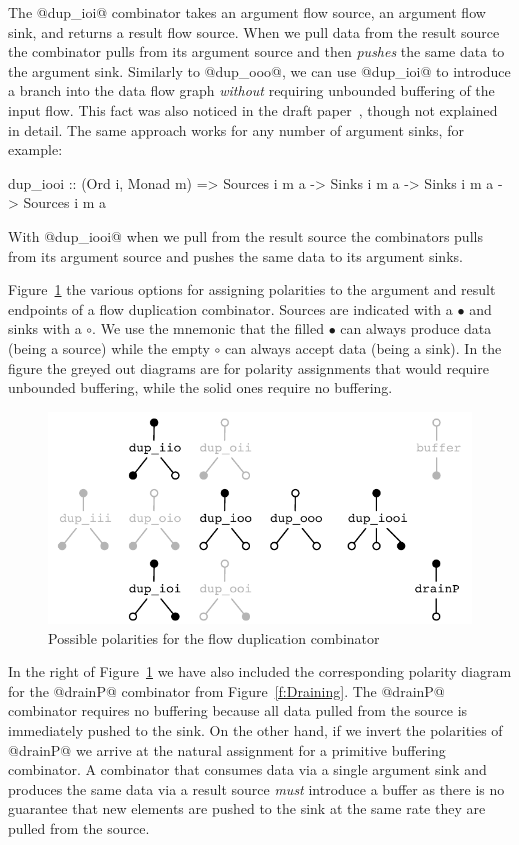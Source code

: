 The @dup_ioi@ combinator takes an argument flow source, an argument flow sink, and returns a result flow source. When we pull data from the result source the combinator pulls from its argument source and then \emph{pushes} the same data to the argument sink. Similarly to @dup_ooo@, we can use @dup_ioi@ to introduce a branch into the data flow graph \emph{without} requiring unbounded buffering of the input flow. This fact was also noticed in the draft paper~\cite{Bernardy:Duality}, though not explained in detail. The same approach works for any number of argument sinks, for example:
\begin{code}
 dup_iooi
  :: (Ord i, Monad m)
  => Sources i m a -> Sinks i m a -> Sinks i m a
  -> Sources i m a
\end{code}

With @dup_iooi@ when we pull from the result source the combinators pulls from its argument source and pushes the same data to its argument sinks. 

Figure~\ref{f:Polarity} the various options for assigning polarities to the argument and result endpoints of a flow duplication combinator. Sources are indicated with a $\bullet$ and sinks with a $\circ$. We use the mnemonic that the filled $\bullet$ can always produce data (being a source) while the empty $\circ$ can always accept data (being a sink). In the figure the greyed out diagrams are for polarity assignments that would require unbounded buffering, while the solid ones require no buffering.

\begin{figure}
\includegraphics[scale=0.7]{figures/polarity.pdf}

\caption{Possible polarities for the flow duplication combinator}
\label{f:Polarity}
\end{figure}

In the right of Figure~\ref{f:Polarity} we have also included the corresponding polarity diagram for the @drainP@ combinator from Figure~\ref{f:Draining}. The @drainP@ combinator requires no buffering because all data pulled from the source is immediately pushed to the sink. On the other hand, if we invert the polarities of @drainP@ we arrive at the natural assignment for a primitive buffering combinator. A combinator that consumes data via a single argument sink and produces the same data via a result source \emph{must} introduce a buffer as there is no guarantee that new elements are pushed to the sink at the same rate they are pulled from the source. 

